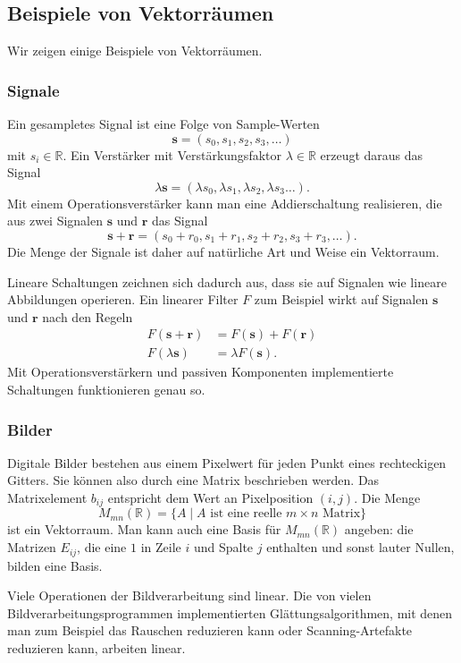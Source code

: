 %
%
\subsection{Beispiele von Vektorräumen}
Wir zeigen einige Beispiele von Vektorräumen.

\subsubsection{Signale}
Ein gesampletes Signal ist eine Folge von Sample-Werten 
\[
\bm{s} = (s_0,s_1,s_2,s_3,\dots)
\]
mit $s_i\in\mathbb R$.
Ein Verstärker mit Verstärkungsfaktor $\lambda\in\mathbb R$ erzeugt daraus
das Signal
\[
\lambda\bm{s} = (\lambda s_0,\lambda s_1,\lambda s_2,\lambda s_3\dots).
\]
Mit einem Operationsverstärker kann man eine Addierschaltung realisieren,
die aus zwei Signalen $\boldsymbol{s}$ und $\boldsymbol{r}$ das Signal
\[
\bm{s} + \bm{r}
=
(s_0+r_0,
s_1+r_1,
s_2+r_2,
s_3+r_3,\dots).
\]
Die Menge der Signale ist daher auf natürliche Art und Weise ein Vektorraum.

Lineare Schaltungen zeichnen sich dadurch aus, dass sie auf Signalen
wie lineare Abbildungen operieren.
Ein linearer Filter $F$ zum Beispiel wirkt auf Signalen
$\bm{s}$ und $\bm{r}$ nach den Regeln
\begin{align*}
F(\bm{s} + \bm{r})&=F(\bm{s}) + F(\bm{r})
\\
F(\lambda \bm{s})&=\lambda F(\bm{s}).
\end{align*}
Mit Operationsverstärkern und passiven Komponenten implementierte
Schaltungen funktionieren genau so.

\subsubsection{Bilder}
Digitale Bilder bestehen aus einem Pixelwert für jeden Punkt eines
rechteckigen Gitters.
Sie können also durch eine Matrix beschrieben werden.
Das Matrixelement $b_{ij}$ entspricht dem Wert an Pixelposition $(i,j)$.
Die Menge
\[
M_{mn}(\mathbb R)
=
\{
A\;|\;
\text{$A$ ist eine reelle $m\times n$ Matrix}
\}
\]
ist ein Vektorraum.
Man kann auch eine Basis für $M_{mn}(\mathbb R)$ angeben:
die Matrizen $E_{ij}$, die eine $1$ in Zeile $i$ und Spalte $j$
enthalten und sonst lauter Nullen, bilden eine Basis.

Viele Operationen der Bildverarbeitung sind linear.
Die von vielen Bildverarbeitungsprogrammen implementierten
Glättungsalgorithmen, mit denen man zum Beispiel das Rauschen reduzieren
kann oder Scanning-Artefakte reduzieren kann, arbeiten linear.

